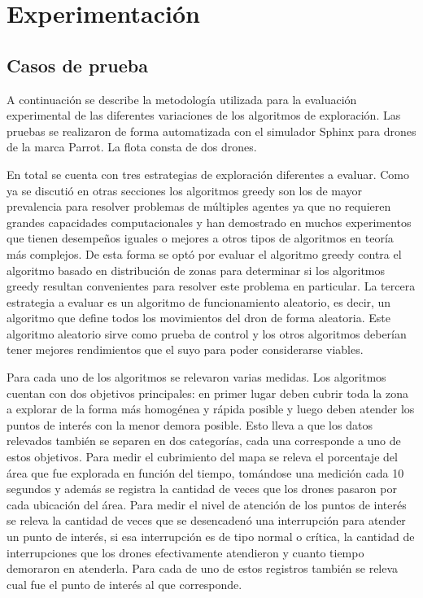 \chapter{Experimentación}

\section {Casos de prueba}
A continuación se describe la metodología utilizada para la evaluación experimental de las diferentes variaciones de los algoritmos de exploración. Las pruebas se realizaron de forma automatizada con el simulador Sphinx para drones de la marca Parrot. La flota consta de dos drones.

En total se cuenta con tres estrategias de exploración diferentes a evaluar. Como ya se discutió en otras secciones los algoritmos greedy son los de mayor prevalencia para resolver problemas de múltiples agentes ya que no requieren grandes capacidades computacionales y han demostrado en muchos experimentos que tienen desempeños iguales o mejores a otros tipos de algoritmos en teoría más complejos. De esta forma se optó por evaluar el algoritmo greedy contra el algoritmo basado en distribución de zonas para determinar si los algoritmos greedy resultan convenientes para resolver este problema en particular. La tercera estrategia a evaluar es un algoritmo de funcionamiento aleatorio, es decir, un algoritmo que define todos los movimientos del dron de forma aleatoria. Este algoritmo aleatorio sirve como prueba de control y los otros algoritmos deberían tener mejores rendimientos que el suyo para poder considerarse viables.

Para cada uno de los algoritmos se relevaron varias medidas. Los algoritmos cuentan con dos objetivos principales: en primer lugar deben cubrir toda la zona a explorar de la forma más homogénea y rápida posible y luego deben atender los puntos de interés con la menor demora posible. Esto lleva a que los datos relevados también se separen en dos categorías, cada una corresponde a uno de estos objetivos.
Para medir el cubrimiento del mapa se releva el porcentaje del área que fue explorada en función del tiempo, tomándose una medición cada 10 segundos y además se registra la cantidad de veces que los drones pasaron por cada ubicación del área.
Para medir el nivel de atención de los puntos de interés se releva la cantidad de veces que se desencadenó una interrupción para atender un punto de interés, si esa interrupción es de tipo normal o crítica, la cantidad de interrupciones que los drones efectivamente atendieron y cuanto tiempo demoraron en atenderla. Para cada de uno de estos registros también se releva cual fue el punto de interés al que corresponde.

